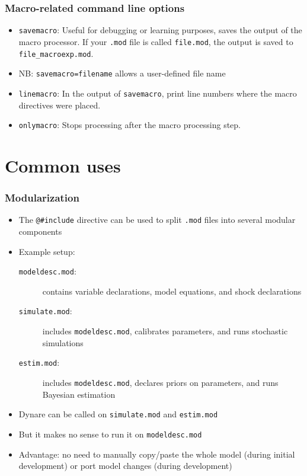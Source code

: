 \documentclass[aspectratio=169]{beamer}
\begin{document}
\begin{frame}
  \frametitle{Macro-related command line options}
  \begin{itemize}
  \item \texttt{savemacro}: Useful for debugging or learning purposes, saves the output of the macro processor. If your \texttt{.mod} file is called \texttt{file.mod}, the output is saved to \texttt{file\_macroexp.mod}.
  \item NB: \texttt{savemacro=filename} allows a user-defined file name
  \item \texttt{linemacro}: In the output of \texttt{savemacro}, print line numbers where the macro directives were placed.
  \item \texttt{onlymacro}: Stops processing after the macro processing step.
  \end{itemize}
\end{frame}

\section{Common uses}

\begin{frame}[fragile=singleslide]
  \frametitle{Modularization}
  \begin{itemize}
  \item The \verb+@#include+ directive can be used to split \texttt{.mod} files into several modular components
  \item Example setup:
    \begin{description}
    \item[\texttt{modeldesc.mod}:] contains variable declarations, model equations, and shock declarations
    \item[\texttt{simulate.mod}:] includes \texttt{modeldesc.mod}, calibrates parameters, and runs stochastic simulations
    \item[\texttt{estim.mod}:] includes \texttt{modeldesc.mod}, declares priors on parameters, and runs Bayesian estimation
    \end{description}
  \item Dynare can be called on \texttt{simulate.mod} and \texttt{estim.mod}
  \item But it makes no sense to run it on \texttt{modeldesc.mod}
  \item Advantage: no need to manually copy/paste the whole model (during initial development) or port model changes (during development)
  \end{itemize}
\end{frame}
\end{document}
